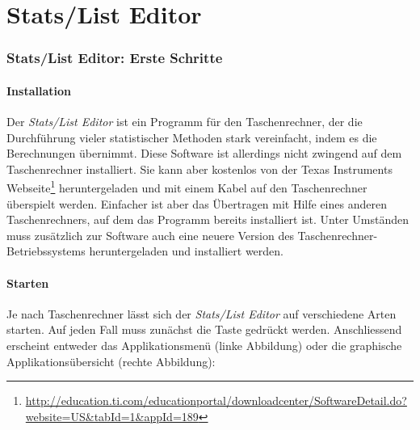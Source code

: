 \documentclass[a4paper,11pt,notitlepage,halfparskip,headsepline,normalheadings,twoside]{scrartcl}
\newlength{\tikey}
\newcommand{\keystroke}[1]{\settowidth{\tikey}{\scriptsize #1}\psframebox[framearc=0.2]{\parbox{\tikey}{\scriptsize\textsf{#1}}}}
\begin{document}
\cleardoublepage

\part{Stats/List Editor}
\section{Stats/List Editor: Erste Schritte}
\subsection{Installation}\label{installation}
Der \textit{Stats/List Editor} ist ein Programm für den Taschenrechner, der
die Durchführung vieler statistischer Methoden stark vereinfacht, indem es die
Berechnungen übernimmt. Diese Software ist allerdings nicht zwingend auf dem
Taschenrechner installiert. Sie kann aber kostenlos von der Texas Instruments
Webseite\footnote{\url{http://education.ti.com/educationportal/downloadcenter/SoftwareDetail.do?website=US&tabId=1&appId=189}}
heruntergeladen und mit einem Kabel auf den Taschenrechner überspielt
werden. Einfacher ist aber das Übertragen mit Hilfe eines anderen
Taschenrechners, auf dem das Programm bereits installiert ist. Unter Umständen
muss zusätzlich zur Software auch eine neuere Version des
Taschenrechner-Betriebssystems heruntergeladen und installiert werden.

\subsection{Starten}
Je nach Taschenrechner lässt sich der \textit{Stats/List Editor} auf
verschiedene Arten starten. Auf jeden Fall muss zunächst die Taste
\keystroke{APPS} gedrückt werden. Anschliessend erscheint entweder das
Applikationsmenü (linke Abbildung) oder die graphische Applikationsübersicht
(rechte Abbildung):
\end{document}

